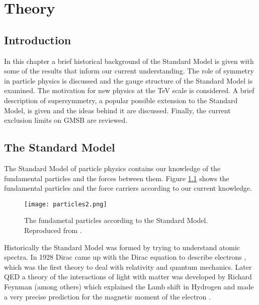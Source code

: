 \chapter{Theory}

\section{Introduction}

In this chapter a brief historical background of the Standard Model is given
with some of the results that inform our current understanding. The role of
symmetry in particle physics is discussed and the gauge structure of the
Standard Model is examined. The motivation for new physics at the TeV scale is
considered. A brief description of supersymmetry, a popular possible extension 
to the Standard Model, is given and the ideas behind it are discussed. Finally,
the current exclusion limits on GMSB are reviewed. 

\section{The Standard Model}

The Standard Model of particle physics \cite{halzen_and_martin, perkins, 
grifiths} contains our knowledge of the fundamental particles and the forces 
between them. Figure \ref{fig:particles} shows the fundamental particles and the 
force carriers according to our current knowledge. \\

\begin{figure}
\begin{center}
\texttt{[image: particles2.png]}
\end{center}
\caption{The fundametal particles according to the Standard Model. Reproduced
from \cite{particles}.}
\label{fig:particles}
\end{figure}

Historically the Standard Model was formed by trying to understand atomic
spectra. In 1928 Dirac came up with the Dirac equation to describe electrons
\cite{dirac}, which was the first theory to deal with relativity and quantum 
mechanics. Later QED a theory of the interactions of light with matter was 
developed by Richard Feynman (among others) \cite{qed} which explained the Lamb 
shift in Hydrogen \cite{lamb} and made a very precise prediction for the 
magnetic moment of the electron \cite{emagmom}. \\

